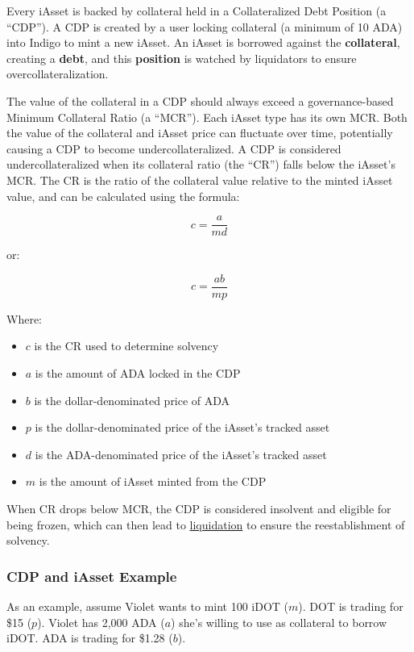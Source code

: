 \documentclass{article}
\begin{document}
\begin{sloppypar}
Every iAsset is backed by collateral held in a Collateralized Debt
Position (a ``CDP''). A CDP is created by a user locking collateral (a
minimum of 10 ADA) into Indigo to mint a new iAsset. An iAsset is
borrowed against the \textbf{collateral}, creating a \textbf{debt}, and
this \textbf{position} is watched by liquidators to ensure
overcollateralization.

The value of the collateral in a CDP should always exceed a
governance-based Minimum Collateral Ratio (a ``MCR''). Each iAsset type
has its own MCR. Both the value of the collateral and iAsset price can
fluctuate over time, potentially causing a CDP to become
undercollateralized. A CDP is considered undercollateralized when its
collateral ratio (the ``CR'') falls below the iAsset's MCR. The CR is
the ratio of the collateral value relative to the minted iAsset value,
and can be calculated using the formula:

\[c = \frac{a}{md}\]

or:

\[c = \frac{ab}{mp}\]

Where:

\begin{itemize}
\item
  \(c\) is the CR used to determine solvency
\item
  \(a\) is the amount of ADA locked in the CDP
\item
  \(b\) is the dollar-denominated price of ADA
\item
  \(p\) is the dollar-denominated price of the iAsset's tracked asset
\item
  \(d\) is the ADA-denominated price of the iAsset's tracked asset
\item
  \(m\) is the amount of iAsset minted from the CDP
\end{itemize}

When CR drops below MCR, the CDP is considered insolvent and eligible
for being frozen, which can then lead to
\protect\hyperlink{stability-pools}{liquidation} to ensure the
reestablishment of solvency.

\hypertarget{cdp-and-iasset-example}{%
\subsubsection{CDP and iAsset Example}\label{cdp-and-iasset-example}}

As an example, assume Violet wants to mint 100 iDOT (\(m\)). DOT is
trading for \$15 (\(p\)). Violet has 2,000 ADA (\(a\)) she's willing to
use as collateral to borrow iDOT. ADA is trading for \$1.28 (\(b\)).


\end{sloppypar}
\end{document}
